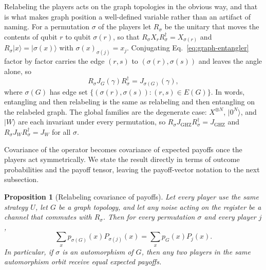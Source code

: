 \documentclass[conference,letterpaper,10pt]{IEEEtran}
\newtheorem{proposition}{Proposition}
\newcommand{\ket}[1]{\ensuremath{|#1\rangle}}
\begin{document}
Relabeling the players acts on the graph topologies in the obvious way, and that
is what makes graph position a well-defined variable rather than an artifact of
naming. For a permutation $\sigma$ of the players let $R_\sigma$ be the unitary
that moves the contents of qubit $r$ to qubit $\sigma(r)$, so that
$R_\sigma X_rR_\sigma^{\dagger}=X_{\sigma(r)}$ and
$R_\sigma\ket{x}=\ket{\sigma(x)}$ with $\sigma(x)_{\sigma(j)}=x_j$. Conjugating
Eq.~\eqref{eq:graph-entangler} factor by factor carries the edge $(r,s)$ to
$(\sigma(r),\sigma(s))$ and leaves the angle alone, so
\begin{equation}
R_\sigma J_G(\gamma)R_\sigma^{\dagger}=J_{\sigma(G)}(\gamma),
\label{eq:graph-covariance}
\end{equation}
where $\sigma(G)$ has edge set $\{(\sigma(r),\sigma(s)):(r,s)\in E(G)\}$. In
words, entangling and then relabeling is the same as relabeling and then
entangling on the relabeled graph. The global families are the degenerate case:
$X^{\otimes N}$, $\ket{0^N}$, and $\ket{W}$ are each invariant under every
permutation, so $R_\sigma J_{\mathrm{GHZ}}R_\sigma^{\dagger}=J_{\mathrm{GHZ}}$
and $R_\sigma J_WR_\sigma^{\dagger}=J_W$ for all $\sigma$.

Covariance of the operator becomes covariance of expected payoffs once the
players act symmetrically. We state the result directly in terms of outcome
probabilities and the payoff tensor, leaving the payoff-vector notation to the
next subsection.

\begin{proposition}[Relabeling covariance of payoffs]
Let every player use the same strategy $U$, let $G$ be a graph topology, and let
any noise acting on the register be a channel that commutes with $R_\sigma$.
Then for every permutation $\sigma$ and every player $j$,
\begin{equation}
\sum_x p_{\sigma(G)}(x)P_{\sigma(j)}(x)
=\sum_x p_G(x)P_j(x).
\label{eq:payoff-covariance}
\end{equation}
In particular, if $\sigma$ is an automorphism of $G$, then any two players in
the same automorphism orbit receive equal expected payoffs.
\end{proposition}
\end{document}
